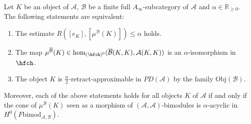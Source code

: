\begin{prop}\label{gio:algfilabo}
	Let $K$ be an object of $\mathcal{A}$, $\mathcal{B}$ be a finite full $A_\infty$-subcategory of $\mathcal{A}$ and $\alpha\in \mathbb{R}_{\geq 0}$. The following statements are equivalent:
	\begin{enumerate}
		\item\label{(1)} The estimate $R([e_K],[\mu^{\overline{\mathcal{B}}}(K)])\leq \alpha$ holds.%
		\item\label{(2)} The map $\mu^{\overline{\mathcal{B}}}(K)\in \text{hom}_{(\hfch)^0}(\overline{\mathcal{B}}(K,K), \mathcal{A}(K,K))$ is an $\alpha$-isomorphism in $\hfch$.%
		\item\label{(3)} The object $K$ is $\frac{\alpha}{2}$-retract-approximable in $PD(\mathcal{A})$ by the family $\text{Obj}(\mathcal{B})$.
	\end{enumerate}
	Moreover, each of the above statements holds for all objects $K$ of $\mathcal{A}$ if and only if the cone of $\mu^{\overline{\mathcal{B}}}(K)$ seen as a morphism of $(\mathcal{A},\mathcal{A})$-bimodules is $\alpha$-acyclic in $H^0(F\text{bimod}_{\mathcal{A}, \mathcal{B}})$.%
\end{prop}

